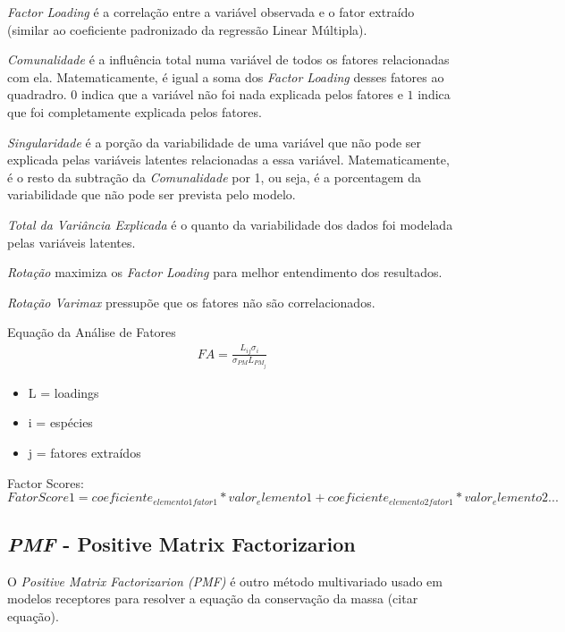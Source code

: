 \textit{Factor Loading} é a correlação entre a variável observada e o fator
extraído (similar ao coeficiente padronizado da regressão Linear Múltipla). 

\textit{Comunalidade} é a influência total numa variável de todos os fatores 
relacionadas com ela. Matematicamente, é igual a soma dos \textit{Factor Loading}
desses fatores ao quadradro. 
$0$ indica que a variável não foi nada explicada pelos fatores e $1$ indica 
que foi completamente explicada pelos fatores. 

\textit{Singularidade} é a porção da variabilidade de uma variável que não 
pode ser explicada pelas variáveis latentes relacionadas a essa variável. 
Matematicamente, é o resto da subtração da \textit{Comunalidade} por 1,
ou seja, é a porcentagem da variabilidade que não pode ser prevista pelo modelo.

\textit{Total da Variância Explicada} é o quanto da variabilidade dos dados foi 
modelada pelas variáveis latentes. 

\textit{Rotação} maximiza os \textit{Factor Loading} para melhor 
entendimento dos resultados. 

\textit{Rotação Varimax} pressupõe que os fatores não são correlacionados.

Equação da Análise de Fatores
\begin{eqnarray}
FA = \frac{L_{ij}\sigma_i}{\sigma_{PM}L_{PM_j}}
\end{eqnarray}

\begin{itemize}
  \item L = loadings
  \item i = espécies
  \item j = fatores extraídos
\end{itemize}

Factor Scores: 
\begin{equation}
FatorScore1 = coeficiente_{elemento1 fator1}*valor_elemento1 + coeficiente_{elemento2 fator1}*valor_elemento2 ...
\end{equation} 

\subsection{\textit{PMF} - Positive Matrix Factorizarion}

O \textit{Positive Matrix Factorizarion (PMF)} é outro método multivariado usado
em modelos receptores para resolver a equação da conservação da massa 
(citar equação). 

